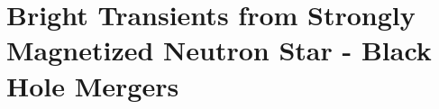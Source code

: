 \chapter[Bright Transients from Black Hole - Neutron Star Mergers]{Bright Transients from Strongly Magnetized Neutron Star - Black Hole Mergers }
\label{ch:NSBH_Fireball}
\let\thefootnote\relax{}












